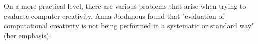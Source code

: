 \begin{comment}
  \begin{itemize}
  \item Can a machine judge whether a human is creative?
  \item Is creativity a property of machines (hardware or software?)
  \item Is mimicking human creativity really enough and appropriate?
  \item Compare against "human creativity"? Or define machine creativity from scratch?
  \item Who is creative? The programmer or the program?
  \item Can creativity be objectively measured?
  \item Quantitative or qualitative?
  \item In respect to P or H creativity?
  \item Output minus input? (we don’t have the same strict judgement on humans)
  \item Is it the product or the process or both?
  \item Does context matter? (Blind deaf dumb person = computer?)
  \item Does time matter?
  \item Does purpose or intention matter?
  \item AGI vs AI? Artificial general creativity vs artificial creativity?
  \end{itemize}
\end{comment}

On a more practical level, there are various problems that arise when trying to evaluate computer creativity. Anna Jordanous found that "evaluation of computational creativity is not being performed in a systematic or standard way" \citep[p.2]{Jordanous2011}(her emphasis).

